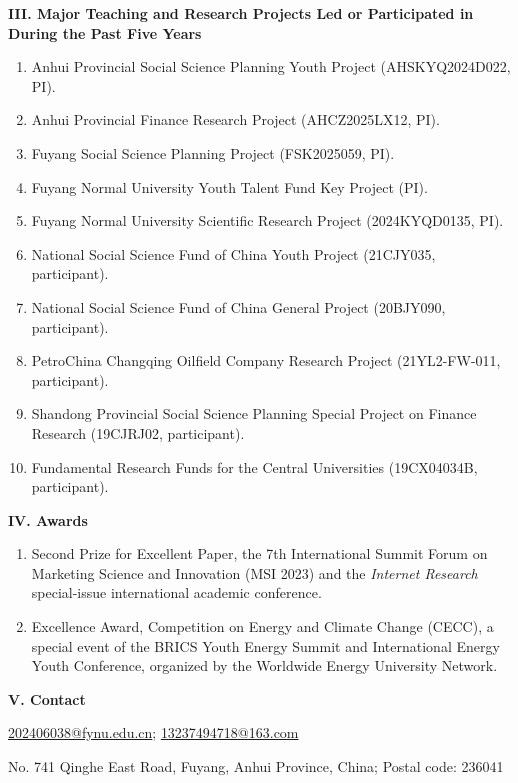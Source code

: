 \documentclass[10pt,a4paper]{article}
\newcommand{\cvsection}[1]{%
  \Needspace{7\baselineskip}%
  \vspace{0.52em plus 0.10em minus 0.05em}%
  \noindent\begingroup\color{cvaccent}\bfseries\large #1\endgroup\par\vspace{0.10em}%
  \noindent{\color{cvaccent}\rule{1.55cm}{1.15pt}}{\color{cvline}\rule{\dimexpr\linewidth-1.55cm\relax}{0.45pt}}\par
  \vspace{0.22em plus 0.04em minus 0.03em}%
}
\newlength{\cvlabelwidth}
\newlength{\cvlabelsep}
\newcommand{\cvitem}[2]{%
  \par\noindent
  \makebox[\cvlabelwidth][r]{\small\bfseries\color{cvaccent}\strut #1}%
  \hspace{\cvlabelsep}%
  \begin{minipage}[t]{\dimexpr\linewidth-\cvlabelwidth-\cvlabelsep\relax}%
    \raggedright\strut #2%
  \end{minipage}\par\vspace{0.16em plus 0.03em minus 0.02em}%
}
\newenvironment{cvnums}{\begin{enumerate}[label={\color{cvaccent}\arabic*.},leftmargin=2.05em,labelsep=0.60em,align=left]}{\end{enumerate}}
\begin{document}
\cvsection{III. Major Teaching and Research Projects Led or Participated in During the Past Five Years}

\begin{cvnums}
\item Anhui Provincial Social Science Planning Youth Project (AHSKYQ2024D022, PI).
\item Anhui Provincial Finance Research Project (AHCZ2025LX12, PI).
\item Fuyang Social Science Planning Project (FSK2025059, PI).
\item Fuyang Normal University Youth Talent Fund Key Project (PI).
\item Fuyang Normal University Scientific Research Project (2024KYQD0135, PI).
\item National Social Science Fund of China Youth Project (21CJY035, participant).
\item National Social Science Fund of China General Project (20BJY090, participant).
\item PetroChina Changqing Oilfield Company Research Project (21YL2-FW-011, participant).
\item Shandong Provincial Social Science Planning Special Project on Finance Research (19CJRJ02, participant).
\item Fundamental Research Funds for the Central Universities (19CX04034B, participant).
\end{cvnums}

\cvsection{IV. Awards}

\begin{cvnums}
\item Second Prize for Excellent Paper, the 7th International Summit Forum on Marketing Science and Innovation (MSI 2023) and the \textit{Internet Research} special-issue international academic conference.
\item Excellence Award, Competition on Energy and Climate Change (CECC), a special event of the BRICS Youth Energy Summit and International Energy Youth Conference, organized by the Worldwide Energy University Network.
\end{cvnums}

\cvsection{V. Contact}

\cvitem{Email:}{\href{mailto:202406038@fynu.edu.cn}{202406038@fynu.edu.cn}; \href{mailto:13237494718@163.com}{13237494718@163.com}}
\cvitem{Address:}{No. 741 Qinghe East Road, Fuyang, Anhui Province, China; Postal code: 236041}
\end{document}
